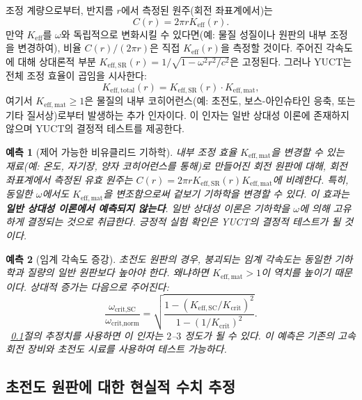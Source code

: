 \documentclass[12pt,a4paper]{article}
\newtheorem{prediction}{예측}[section]
\begin{document}
	조정 계량으로부터, 반지름 \(r\)에서 측정된 원주(회전 좌표계에서)는
	\[
	C(r) = 2\pi r K_{\mathrm{eff}}(r).
	\]
	만약 \(K_{\mathrm{eff}}\)를 \(\omega\)와 독립적으로 변화시킬 수 있다면(예: 물질 성질이나 원판의 내부 조정을 변경하여), 비율 \(C(r)/(2\pi r)\)은 직접 \(K_{\mathrm{eff}}(r)\)을 측정할 것이다. 주어진 각속도에 대해 상대론적 부분 \(K_{\mathrm{eff,SR}}(r) = 1/\sqrt{1-\omega^2 r^2/c^2}\)은 고정된다. 그러나 YUCT는 전체 조정 효율이 곱임을 시사한다:
	\[
	K_{\mathrm{eff,total}}(r) = K_{\mathrm{eff,SR}}(r) \cdot K_{\mathrm{eff,mat}},
	\]
	여기서 \(K_{\mathrm{eff,mat}} \ge 1\)은 물질의 내부 코히어런스(예: 초전도, 보스-아인슈타인 응축, 또는 기타 질서상)로부터 발생하는 추가 인자이다. 이 인자는 일반 상대성 이론에 존재하지 않으며 YUCT의 결정적 테스트를 제공한다.
	
	\begin{prediction}[제어 가능한 비유클리드 기하학]
		내부 조정 효율 \(K_{\mathrm{eff,mat}}\)을 변경할 수 있는 재료(예: 온도, 자기장, 양자 코히어런스를 통해)로 만들어진 회전 원판에 대해, 회전 좌표계에서 측정된 유효 원주는 \(C(r) = 2\pi r K_{\mathrm{eff,SR}}(r) K_{\mathrm{eff,mat}}\)에 비례한다. 특히, 동일한 \(\omega\)에서도 \(K_{\mathrm{eff,mat}}\)을 변조함으로써 겉보기 기하학을 변경할 수 있다. 이 효과는 \textbf{일반 상대성 이론에서 예측되지 않는다}. 일반 상대성 이론은 기하학을 \(\omega\)에 의해 고유하게 결정되는 것으로 취급한다. 긍정적 실험 확인은 YUCT의 결정적 테스트가 될 것이다.
	\end{prediction}
	
	\begin{prediction}[임계 각속도 증강]
		초전도 원판의 경우, 붕괴되는 임계 각속도는 동일한 기하학과 질량의 일반 원판보다 높아야 한다. 왜냐하면 \(K_{\mathrm{eff,mat}} > 1\)이 역치를 높이기 때문이다. 상대적 증가는 다음으로 주어진다:
		\[
		\frac{\omega_{\text{crit,SC}}}{\omega_{\text{crit,norm}}} = \sqrt{ \frac{1 - (K_{\mathrm{eff,SC}}/K_{\mathrm{crit}})^2}{1 - (1/K_{\mathrm{crit}})^2} }.
		\]
		~\ref{subsec:numerical}절의 추정치를 사용하면 이 인자는 \(2\)–\(3\) 정도가 될 수 있다. 이 예측은 기존의 고속 회전 장비와 초전도 시료를 사용하여 테스트 가능하다.
	\end{prediction}
	
	\subsection{초전도 원판에 대한 현실적 수치 추정}
	\label{subsec:numerical}
	
\end{document}
